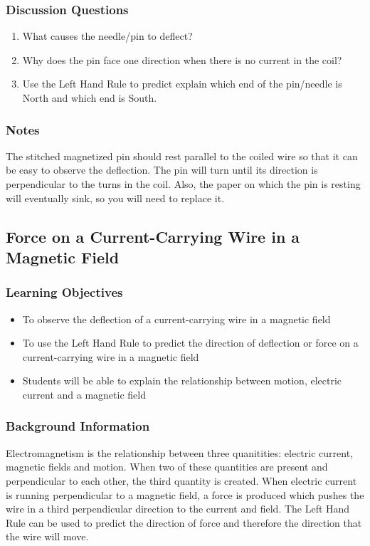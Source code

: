 \subsubsection*{Discussion Questions}
\begin{enumerate}
\item{What causes the needle/pin to deflect?}
\item{Why does the pin face one direction when there is no current in the coil?}
\item{Use the Left Hand Rule to predict explain which end of the pin/needle is North and which end is South.} 
\end{enumerate}

\subsubsection*{Notes}
The stitched magnetized pin should rest parallel to the coiled wire so that it can be easy to observe the deflection. The pin will turn until its direction is perpendicular to the turns in the coil. Also, the paper on which the pin is resting will eventually sink, so you will need to replace it.  

\subsection{Force on a Current-Carrying Wire in a Magnetic Field}

\subsubsection*{Learning Objectives}
\begin{itemize}
\item{To observe the deflection of a current-carrying wire in a magnetic field} 
\item{To use the Left Hand Rule to predict the direction of deflection or force on a current-carrying wire in a magnetic field} 
\item{Students will be able to explain the relationship between motion, electric current and a magnetic field}
\end{itemize}

\subsubsection*{Background Information}
Electromagnetism is the relationship between three quanitities: electric current, magnetic fields and motion. When two of these quantities are present and perpendicular to each other, the third quantity is created. When electric current is running perpendicular to a magnetic field, a force is produced which pushes the wire in a third perpendicular direction to the current and field. The Left Hand Rule can be used to predict the direction of force and therefore the direction that the wire will move.  


